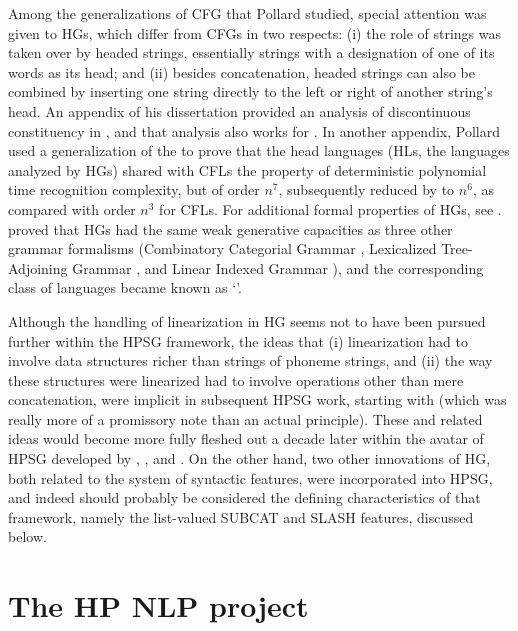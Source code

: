 \documentclass[output=paper]{langsci/langscibook}
\begin{document}
Among the generalizations of CFG that Pollard studied, special attention was given to HGs, which differ from CFGs in two respects: (i) the role of strings was taken over by headed strings, essentially strings with a designation of one of its words as its head; and (ii) besides concatenation, headed strings can also be combined by inserting one string directly to the left or right of another string's head. An appendix of his dissertation \citep{Pollard84a-u} provided an analysis of discontinuous constituency in , and that analysis also works for . In another appendix, Pollard used a generalization of the  to prove that the head languages (HLs, the languages analyzed by HGs) shared with CFLs the property of deterministic polynomial time recognition complexity, but of order $n^{7}$, subsequently reduced by \citet*{Kasamietal1989} to $n^{6}$, as compared with order $n^{3}$ for CFLs. For additional formal properties of HGs, see \citet{Roach1987}. \citet{VijayWeir1994} proved that HGs had the same weak generative capacities as three other grammar formalisms (Combinatory Categorial Grammar \citep{Steedman87a-u,Steedman90a-u}, Lexicalized Tree-Adjoining Grammar \citep{Shabes90}, and Linear Indexed Grammar \citep{Gazdar88a-u}), and the corresponding class of languages became known as `'.

Although the handling of linearization in HG seems not to have been pursued further within the HPSG framework, the ideas that (i) linearization had to involve data structures richer than strings of phoneme strings, and (ii) the way these structures were linearized had to involve operations other than mere concatenation, were implicit in subsequent HPSG work, starting with   (which was really more of a promissory note than an actual principle).  These and related ideas would become more fully fleshed out a decade later within the  avatar of HPSG developed by \citet{Reape90a}, \citet{Reape92a}, and \citet{Kathol95a,Kathol2000a}. On the other hand, two other innovations of HG, both related to the system of syntactic features, were incorporated into HPSG, and indeed should probably be considered the defining characteristics of that framework, namely the list-valued SUBCAT and SLASH features, discussed below.


\section{The HP NLP project}
\end{document}
